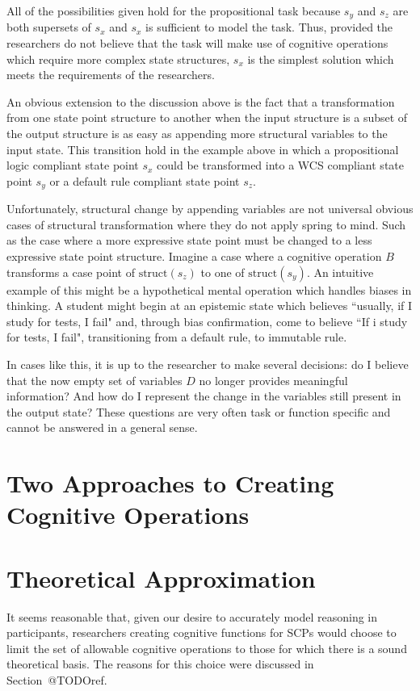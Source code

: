 All of the possibilities given hold for the propositional task because $s_y$ and $s_z$ are both supersets of $s_x$ and $s_x$ is sufficient to model the task. Thus, provided the researchers do not believe that the task will make use of cognitive operations which require more complex state structures, $s_x$ is the simplest solution which meets the requirements of the researchers.

An obvious extension to the discussion above is the fact that a transformation from one state point structure to another when the input structure is a subset of the output structure is as easy as appending more structural variables to the input state. This transition hold in the example above in which a propositional logic compliant state point $s_x$ could be transformed into a WCS compliant state point $s_y$ or a default rule compliant state point $s_z$.

Unfortunately, structural change by appending variables are not universal obvious cases of structural transformation where they do not apply spring to mind. Such as the case where a more expressive state point must be changed to a less expressive state point structure. Imagine a case where a cognitive operation $B$ transforms a case point of $\textrm{struct}(s_z)$ to one of $\textrm{struct}(s_y)$. An intuitive example of this might be a hypothetical mental operation which handles biases in thinking. A student might begin at an epistemic state which believes ``usually, if I study for tests, I fail" and, through bias confirmation, come to believe ``If i study for tests, I fail", transitioning from a default rule, to immutable rule. 

In cases like this, it is up to the researcher to make several decisions: do I believe that the now empty set of variables $D$ no longer provides meaningful information? And how do I represent the change in the variables still present in the output state? These questions are very often task or function specific and cannot be answered in a general sense.

\section{Two Approaches to Creating Cognitive Operations}
\section{Theoretical Approximation}
It seems reasonable that, given our desire to accurately model reasoning in participants, researchers creating cognitive functions for SCPs would choose to limit the set of allowable cognitive operations to those for which there is a sound theoretical basis. The reasons for this choice were discussed in Section~@TODOref.

